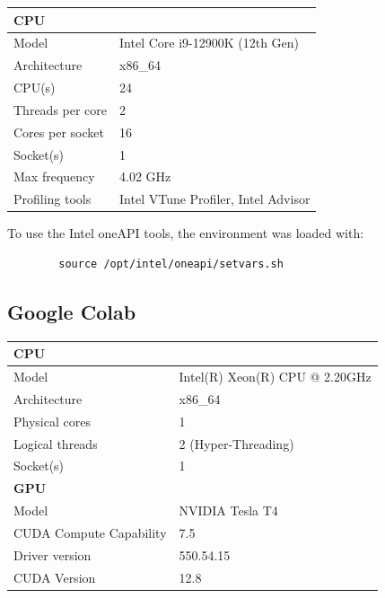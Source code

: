 \begin{table}[h!]
\renewcommand{\arraystretch}{1.2}
\begin{tabularx}{\textwidth}{lX}

\multicolumn{2}{l}{\textbf{CPU}} \\ \hline
Model & Intel Core i9-12900K (12th Gen) \\
Architecture & x86\_64 \\
CPU(s) & 24 \\
Threads per core & 2 \\
Cores per socket & 16 \\
Socket(s) & 1 \\
Max frequency & 4.02 GHz \\
Profiling tools & Intel VTune Profiler, Intel Advisor \\[6pt]

\end{tabularx}
\end{table}

To use the Intel oneAPI tools, the environment was loaded with:
\begin{verbatim}
        source /opt/intel/oneapi/setvars.sh
\end{verbatim}


\subsection{Google Colab}

\begin{table}[h!]
\renewcommand{\arraystretch}{1.2}
\begin{tabularx}{\textwidth}{lX}

\multicolumn{2}{l}{\textbf{CPU}} \\ \hline
Model & Intel(R) Xeon(R) CPU @ 2.20GHz \\
Architecture & x86\_64 \\
Physical cores & 1 \\
Logical threads & 2 (Hyper-Threading) \\
Socket(s) & 1 \\[6pt]

\multicolumn{2}{l}{\textbf{GPU}} \\ \hline
Model & NVIDIA Tesla T4 \\
CUDA Compute Capability & 7.5 \\
Driver version & 550.54.15 \\
CUDA Version & 12.8 \\[6pt]

\end{tabularx}
\end{table}
